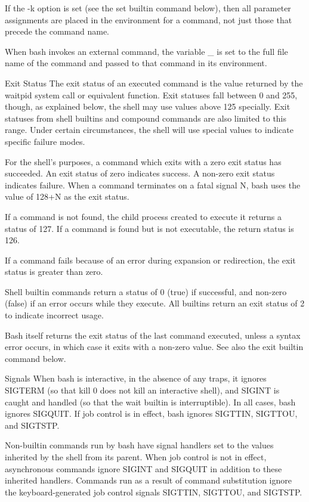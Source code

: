 \documentclass[11pt]{article}
\begin{document}
{{{If the -k option is set (see the set builtin command below), then all parameter assignments are placed in the environment for a command, not just those that precede the command name.

When bash invokes an external command, the variable _ is set to the full file name of the command and passed to that command in its environment.

Exit Status
The exit status of an executed command is the value returned by the waitpid system call or equivalent function. Exit statuses fall between 0 and 255, though, as explained below, the shell may use values above 125 specially. Exit statuses from shell builtins and compound commands are also limited to this range. Under certain circumstances, the shell will use special values to indicate specific failure modes.

For the shell's purposes, a command which exits with a zero exit status has succeeded. An exit status of zero indicates success. A non-zero exit status indicates failure. When a command terminates on a fatal signal N, bash uses the value of 128+N as the exit status.

If a command is not found, the child process created to execute it returns a status of 127. If a command is found but is not executable, the return status is 126.

If a command fails because of an error during expansion or redirection, the exit status is greater than zero.

Shell builtin commands return a status of 0 (true) if successful, and non-zero (false) if an error occurs while they execute. All builtins return an exit status of 2 to indicate incorrect usage.

Bash itself returns the exit status of the last command executed, unless a syntax error occurs, in which case it exits with a non-zero value. See also the exit builtin command below.

Signals
When bash is interactive, in the absence of any traps, it ignores SIGTERM (so that kill 0 does not kill an interactive shell), and SIGINT is caught and handled (so that the wait builtin is interruptible). In all cases, bash ignores SIGQUIT. If job control is in effect, bash ignores SIGTTIN, SIGTTOU, and SIGTSTP.

Non-builtin commands run by bash have signal handlers set to the values inherited by the shell from its parent. When job control is not in effect, asynchronous commands ignore SIGINT and SIGQUIT in addition to these inherited handlers. Commands run as a result of command substitution ignore the keyboard-generated job control signals SIGTTIN, SIGTTOU, and SIGTSTP.

}}}
\end{document}
